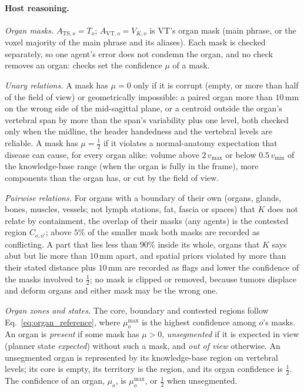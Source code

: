 \documentclass[fleqn,10pt]{olplainarticle}
\begin{document}
\paragraph{Host reasoning.}
\label{sec:host_details}
\emph{Organ masks.} $A_{\mathrm{TS},o}=T_o$; $A_{\mathrm{VT},o}=V_{K,o}$ is VT's organ mask (main phrase, or the voxel
majority of the main phrase and its aliases). Each mask is checked separately, so one agent's error does not condemn the
organ, and no check removes an organ: checks set the confidence $\mu$ of a mask.

\emph{Unary relations.} A mask has $\mu=0$ only if it is corrupt (empty, or more than half of the field of view) or
geometrically impossible: a paired organ more than $10$\,mm on the wrong side of the mid-sagittal plane, or a centroid
outside the organ's vertebral span by more than the span's variability plus one level, both checked only when the
midline, the header handedness and the vertebral levels are reliable. A mask has $\mu=\tfrac12$ if it violates a
normal-anatomy expectation that disease can cause, for every organ alike: volume above $2\,v_{\max}$ or below
$0.5\,v_{\min}$ of the knowledge-base range (when the organ is fully in the frame), more components than the organ has, or
cut by the field of view.

\emph{Pairwise relations.} For organs with a boundary of their own (organs, glands, bones, muscles, vessels; not lymph
stations, fat, fascia or spaces) that $K$ does not relate by containment, the overlap of their masks (any agents) is the
contested region $C_{o,o'}$; above $5\%$ of the smaller mask both masks are recorded as conflicting. A part that lies less
than $90\%$ inside its whole, organs that $K$ says abut but lie more than $10$\,mm apart, and spatial priors violated by more
than their stated distance plus $10$\,mm are recorded as flags and lower the confidence of the masks involved to
$\tfrac12$; no mask is clipped or removed, because tumors displace and deform organs and either mask may be the wrong one.

\emph{Organ zones and states.} The core, boundary and contested regions follow Eq.~\eqref{eq:organ_reference}, where
$\mu^{\max}_o$ is the highest confidence among $o$'s masks. An organ is \emph{present} if some mask has $\mu>0$,
\emph{unsegmented} if it is expected in view (planner state \emph{expected}) without such a mask, and \emph{out of view}
otherwise. An unsegmented organ is represented by its knowledge-base region on vertebral levels; its core is empty, its
territory is the region, and its organ confidence is $\tfrac12$. The confidence of an organ, $\mu_o$, is $\mu^{\max}_o$, or
$\tfrac12$ when unsegmented.
\end{document}

